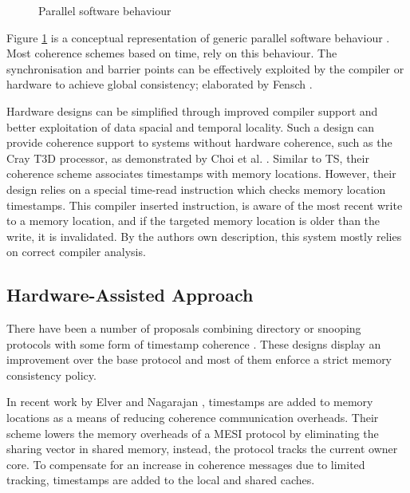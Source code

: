				\begin{figure}[t]
					\centering 
						\caption{Parallel software behaviour} 
						\label{software_sync}
				\end{figure}
				
				Figure \ref{software_sync} is a conceptual representation of generic parallel software behaviour \cite{Choi00_0,Choi00_1}. Most coherence schemes based on time, rely on this behaviour. The synchronisation and barrier points can be effectively exploited by the compiler or hardware to achieve global consistency; elaborated by Fensch \cite{Fensch08}.

				Hardware designs can be simplified through improved compiler support and better exploitation of data spacial and temporal locality. Such a design can provide coherence support to systems without hardware coherence, such as the Cray T3D processor, as demonstrated by Choi et al. \cite{Choi94,Choi96,Choi00_0,Choi00_1}. 
				Similar to TS, their coherence scheme associates timestamps with memory locations. However, their design relies on a special time-read instruction which checks memory location timestamps.
				This compiler inserted instruction, is aware of the most recent write to a memory location, and if the targeted memory location is older than the write, it is invalidated. 
				By the authors own description, this system mostly relies on correct compiler analysis. 
			
		
			\subsection{Hardware-Assisted Approach}
				There have been a number of proposals combining directory or snooping protocols with some form of timestamp coherence \cite{Lebeck95,Lai00,Yu15_0,Yu15_1,Kurian15}. These designs display an improvement over the base protocol and most of them enforce a strict memory consistency policy.

				In recent work by Elver and Nagarajan \cite{Elver14}, timestamps are added to memory locations as a means of reducing coherence communication overheads. Their scheme lowers the memory overheads of a MESI protocol by eliminating the sharing vector in shared memory, instead, the protocol tracks the current owner core. To compensate for an increase in coherence messages due to limited tracking, timestamps are added to the local and shared caches. 

